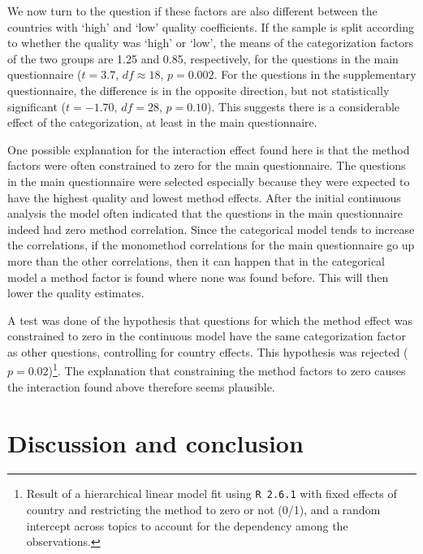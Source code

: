 \documentclass[a4paper,12pt]{article}
\begin{document}
We now turn to the question if these factors are also different between the countries with `high' and `low' quality coefficients. If the sample is split according to whether the quality was `high'  or `low', the means of the categorization factors of the two groups are 1.25 and 0.85, respectively, for the questions in the main questionnaire ($t = 3.7$, $df \approx 18$, $p = 0.002$. For the questions in the supplementary questionnaire, the difference is in the opposite direction, but not statistically significant ($t = -1.70$, $df = 28$, $p = 0.10$). This suggests there is a considerable effect of the categorization, at least in the main questionnaire.

 
One possible explanation for the interaction effect found here is that the method factors were often constrained to zero for the main questionnaire. The questions in the main questionnaire were selected especially because they were expected to have the highest quality and lowest method effects. After the initial continuous analysis the model often indicated that the questions in the main questionnaire indeed had zero method correlation. Since the categorical model tends to increase the correlations, if the monomethod correlations for the main questionnaire go up more than the other correlations, then it can happen that in the categorical model a method factor is found where none was found before. This will then lower the quality estimates.

A test was done of the hypothesis that questions for which the method effect was constrained to zero in the continuous model have the same categorization factor as other questions, controlling for country effects. This hypothesis was rejected ($p=0.02$)\footnote{Result of a hierarchical linear model fit using \texttt{R 2.6.1} with fixed effects of country and restricting the method to zero or not (0/1), and a random intercept across topics to account for the dependency among the observations.}. The explanation that constraining the method factors to zero causes the interaction found above therefore seems plausible.


\section{Discussion and conclusion}
\end{document}
